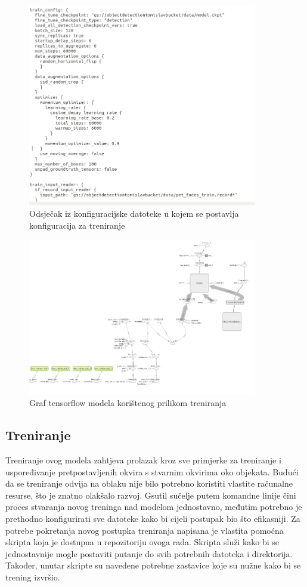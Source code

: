 \begin{figure}[htb]
    \centering
    \includegraphics[width=10cm]{img/pipeline.png}
    \caption{Odsječak iz konfiguracijske datoteke u kojem se postavlja konfiguracija za treniranje}
    \label{Pipeline}
\end{figure}

\begin{figure}[htb]
    \centering
    \includegraphics[width=10cm]{img/izgled-modela.png}
    \caption{Graf tensorflow modela korištenog prilikom treniranja}
    \label{TF-model}
\end{figure}


\subsection{Treniranje}
Treniranje ovog modela zahtjeva prolazak kroz sve primjerke za treniranje i uspoređivanje pretpostavljenih okvira s stvarnim okvirima oko objekata. Budući da se treniranje odvija na oblaku 
nije bilo potrebno koristiti vlastite računalne resurse, što je znatno olakšalo razvoj. Gsutil sučelje putem komandne linije čini proces stvaranja novog treninga nad modelom 
jednostavno, međutim potrebno je prethodno konfigurirati sve datoteke kako bi cijeli postupak bio što efikasniji. Za potrebe pokretanja novog postupka treniranja napisana je vlastita
pomoćna skripta koja je dostupna u repozitoriju ovoga rada. Skripta služi kako bi se jednostavnije mogle postaviti putanje do svih potrebnih datoteka i direktorija. Također, unutar
skripte su navedene potrebne zastavice koje su nužne kako bi se trening izvršio. 

